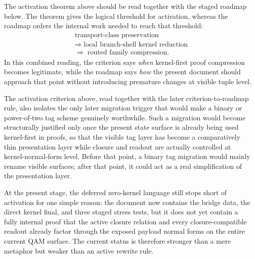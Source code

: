 \begin{remark}\label{rem:qam-zero-kernel-criterion-roadmap}
The activation theorem above should be read together with the staged roadmap below. The theorem gives the logical threshold for activation, whereas the roadmap orders the internal work needed to reach that threshold:
\[
\begin{aligned}
&\text{transport-class preservation}\\[0.15em]
&\Longrightarrow\;\text{local branch-shell kernel reduction}\\[0.15em]
&\Longrightarrow\;\text{routed family compression}.
\end{aligned}
\]
In this combined reading, the criterion says \emph{when} kernel-first proof compression becomes legitimate, while the roadmap says \emph{how} the present document should approach that point without introducing premature changes at visible tuple level.
\end{remark}

\begin{remark}\label{rem:qam-zero-kernel-migration-trigger}
The activation criterion above, read together with the later criterion-to-roadmap rule, also isolates the only later migration trigger that would make a binary or power-of-two tag scheme genuinely worthwhile. Such a migration would become structurally justified only once the present state surface is already being used kernel-first in proofs, so that the visible tag layer has become a comparatively thin presentation layer while closure and readout are actually controlled at kernel-normal-form level. Before that point, a binary tag migration would mainly rename visible surfaces; after that point, it could act as a real simplification of the presentation layer.
\end{remark}

\begin{remark}\label{rem:qam-zero-kernel-activation-gap}
At the present stage, the deferred zero-kernel language still stops short of activation for one simple reason: the document now contains the bridge data, the direct kernel final, and three staged stress tests, but it does not yet contain a fully internal proof that the active closure relation and every closure-compatible readout already factor through the exposed payload normal forms on the entire current QAM surface. The current status is therefore stronger than a mere metaphor but weaker than an active rewrite rule.
\end{remark}


